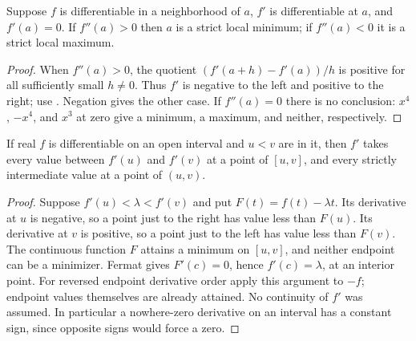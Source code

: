 \begin{theorem}
Suppose $f$ is differentiable in a neighborhood of $a$, $f'$ is differentiable at $a$, and $f'(a)=0$. If $f''(a)>0$ then $a$ is a strict local minimum; if $f''(a)<0$ it is a strict local maximum.
\end{theorem}
\begin{proof}
When $f''(a)>0$, the quotient $(f'(a+h)-f'(a))/h$ is positive for all sufficiently small $h\ne0$. Thus $f'$ is negative to the left and positive to the right; use . Negation gives the other case. If $f''(a)=0$ there is no conclusion: $x^4$, $-x^4$, and $x^3$ at zero give a minimum, a maximum, and neither, respectively.
\end{proof}

\begin{theorem}
If real $f$ is differentiable on an open interval and $u<v$ are in it, then $f'$ takes every value between $f'(u)$ and $f'(v)$ at a point of $[u,v]$, and every strictly intermediate value at a point of $(u,v)$.
\end{theorem}
\begin{proof}
Suppose $f'(u)<\lambda<f'(v)$ and put $F(t)=f(t)-\lambda t$. Its derivative at $u$ is negative, so a point just to the right has value less than $F(u)$. Its derivative at $v$ is positive, so a point just to the left has value less than $F(v)$. The continuous function $F$ attains a minimum on $[u,v]$, and neither endpoint can be a minimizer. Fermat gives $F'(c)=0$, hence $f'(c)=\lambda$, at an interior point. For reversed endpoint derivative order apply this argument to $-f$; endpoint values themselves are already attained. No continuity of $f'$ was assumed. In particular a nowhere-zero derivative on an interval has a constant sign, since opposite signs would force a zero.
\end{proof}

